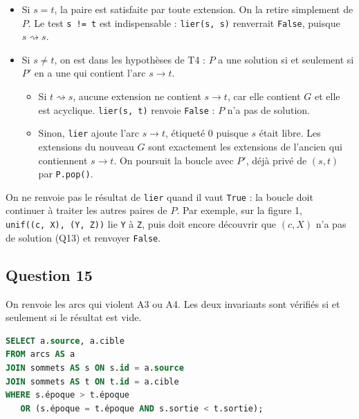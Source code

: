 \documentclass[11pt,a4paper]{article}
\providecommand{\tightlist}{\setlength{\itemsep}{0pt}\setlength{\parskip}{0pt}}
\begin{document}
\begin{itemize}
\tightlist
\item
  Si \(s=t\), la paire est satisfaite par toute extension. On la retire simplement de \(P\). Le test \texttt{s\ !=\ t} est indispensable : \texttt{lier(s,\ s)} renverrait \texttt{False}, puisque \(s\rightsquigarrow s\).
\item
  Si \(s\neq t\), on est dans les hypothèses de T4 : \(P\) a une solution si et seulement si \(P'\) en a une qui contient l'arc \(s\to t\).

  \begin{itemize}
  \tightlist
  \item
    Si \(t\rightsquigarrow s\), aucune extension ne contient \(s\to t\), car elle contient \(G\) et elle est acyclique. \texttt{lier(s,\ t)} renvoie \texttt{False} : \(P\) n'a pas de solution.
  \item
    Sinon, \texttt{lier} ajoute l'arc \(s\to t\), étiqueté 0 puisque \(s\) était libre. Les extensions du nouveau \(G\) sont exactement les extensions de l'ancien qui contiennent \(s\to t\). On poursuit la boucle avec \(P'\), déjà privé de \((s,t)\) par \texttt{P.pop()}.
  \end{itemize}
\end{itemize}

On ne renvoie pas le résultat de \texttt{lier} quand il vaut \texttt{True} : la boucle doit continuer à traiter les autres paires de \(P\). Par exemple, sur la figure 1, \texttt{unif(\allowbreak{}{[}(\allowbreak{}\textquotesingle{}c\textquotesingle{},\allowbreak{}\ \textquotesingle{}X\textquotesingle{})\allowbreak{},\allowbreak{}\ (\allowbreak{}\textquotesingle{}Y\textquotesingle{},\allowbreak{}\ \textquotesingle{}Z\textquotesingle{})\allowbreak{}{]}\allowbreak{})\allowbreak{}} lie \texttt{Y} à \texttt{Z}, puis doit encore découvrir que \((c,X)\) n'a pas de solution (Q13) et renvoyer \texttt{False}.

\hypertarget{question-15}{%
\subsection{Question 15}\label{question-15}}

On renvoie les arcs qui violent A3 ou A4. Les deux invariants sont vérifiés si et seulement si le résultat est vide.

\begin{lstlisting}[language=SQL]
SELECT a.source, a.cible
FROM arcs AS a
JOIN sommets AS s ON s.id = a.source
JOIN sommets AS t ON t.id = a.cible
WHERE s.époque > t.époque
   OR (s.époque = t.époque AND s.sortie < t.sortie);
\end{lstlisting}
\end{document}
